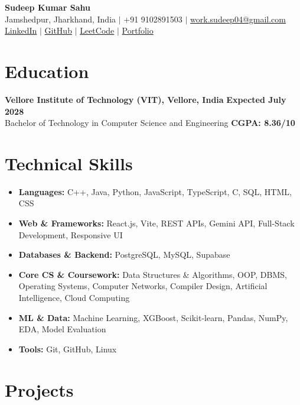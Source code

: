 \documentclass[10pt,letterpaper]{article}
\begin{document}
\begin{center}
  {\LARGE \textbf{Sudeep Kumar Sahu}}\\[3pt]
  Jamshedpur, Jharkhand, India $|$ +91 9102891503 $|$
  \href{mailto:work.sudeep04@gmail.com}{work.sudeep04@gmail.com}\\[2pt]
  \href{https://www.linkedin.com/in/sudeep-kumar-sahu-3a1537343/}{LinkedIn} $|$
  \href{https://github.com/sudeep-codes}{GitHub} $|$
  \href{https://leetcode.com/u/sudeep_codes/}{LeetCode} $|$
  \href{https://sudeepcodes.me/}{Portfolio}
\end{center}

\section{Education}
\textbf{Vellore Institute of Technology (VIT), Vellore, India} \hfill \textbf{Expected July 2028}\\
Bachelor of Technology in Computer Science and Engineering \hfill \textbf{CGPA: 8.36/10}

\section{Technical Skills}
\begin{itemize}[leftmargin=0in, label={}, itemsep=1.5pt]
  \item \textbf{Languages:} C++, Java, Python, JavaScript, TypeScript, C, SQL, HTML, CSS
  \item \textbf{Web \& Frameworks:} React.js, Vite, REST APIs, Gemini API, Full-Stack Development, Responsive UI
  \item \textbf{Databases \& Backend:} PostgreSQL, MySQL, Supabase
  \item \textbf{Core CS \& Coursework:} Data Structures \& Algorithms, OOP, DBMS, Operating Systems, Computer Networks, Compiler Design, Artificial Intelligence, Cloud Computing
  \item \textbf{ML \& Data:} Machine Learning, XGBoost, Scikit-learn, Pandas, NumPy, EDA, Model Evaluation
  \item \textbf{Tools:} Git, GitHub, Linux
\end{itemize}

\section{Projects}
\end{document}
